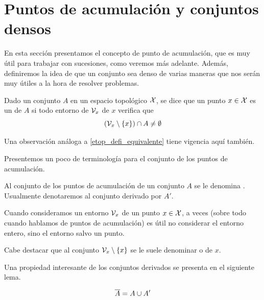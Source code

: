 \section{Puntos de acumulación y conjuntos densos}
En esta sección presentamos el concepto de punto de acumulación, que es muy útil para trabajar con sucesiones, como veremos más adelante. Además, definiremos la idea de que un conjunto sea denso de varias maneras que nos serán muy útiles a la hora de resolver problemas.
\begin{defi}
	\label{etop_defi_puntoAcumulacion}
	Dado un conjunto $A$ en un espacio topológico $\mathcal{X}$, se dice que un punto $x\in\mathcal{X}$ es un  de $A$ si todo entorno de $\mathcal{V}_x$ de $x$ verifica que
	\begin{equation*}
	(\mathcal{V}_x\setminus\{x\})\cap A\not=\emptyset
	\end{equation*}
\end{defi}
\begin{obs}
	Una observación análoga a \ref{etop_defi_equivalente} tiene vigencia aquí también.
\end{obs}
Presentemos un poco de terminología para el conjunto de los puntos de acumulación.
\begin{defi}
	Al conjunto de los puntos de acumulación de un conjunto $A$ se le denomina . Usualmente denotaremos al conjunto derivado por $A'$.
\end{defi}
\begin{obs}
	Cuando consideramos un entorno $\mathcal{V}_x$ de un punto $x\in\mathcal{X}$, a veces (sobre todo cuando hablamos de puntos de acumulación) es útil no considerar el entorno entero, sino el entorno salvo un punto.
	
	Cabe destacar que al conjunto $\mathcal{V}_x\setminus\{x\}$ se le suele denominar  o  de $x$.
\end{obs}
Una propiedad interesante de los conjuntos derivados se presenta en el siguiente lema.
\begin{lem}
	\label{etop_lem_descomposicion}
	\begin{equation*}
	\overline{A}=A\cup A'
	\end{equation*}
\end{lem}
